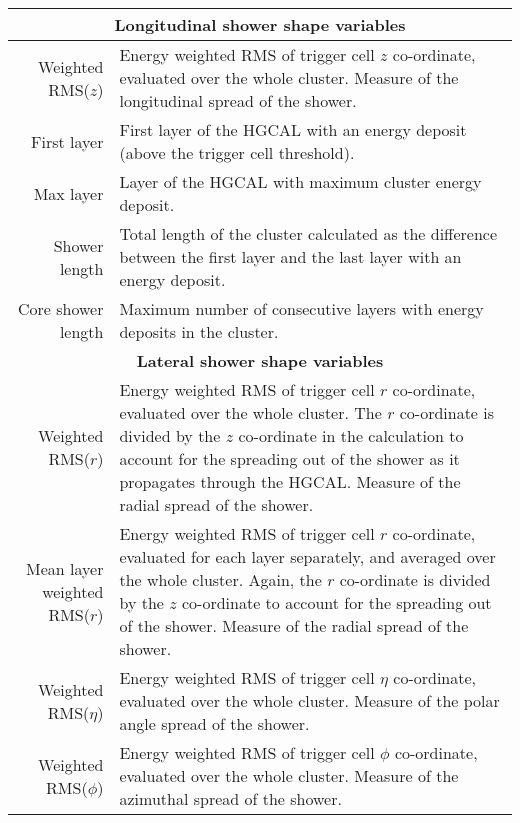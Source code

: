 \begin{tabular}{r|p{}}
    \multicolumn{2}{c}{\textbf{Longitudinal shower shape variables}} \\ \hline
    Weighted RMS($z$) & Energy weighted RMS of trigger cell $z$ co-ordinate, evaluated over the whole cluster. Measure of the longitudinal spread of the shower. \\
    First layer & First layer of the HGCAL with an energy deposit (above the trigger cell threshold). \\
    Max layer &  Layer of the HGCAL with maximum cluster energy deposit. \\
    Shower length & Total length of the cluster calculated as the difference between the first layer and the last layer with an energy deposit. \\
    Core shower length & Maximum number of consecutive layers with energy deposits in the cluster. \\
    \hline
    \multicolumn{2}{c}{\textbf{Lateral shower shape variables}} \\ \hline
    Weighted RMS($r$) & Energy weighted RMS of trigger cell $r$ co-ordinate, evaluated over the whole cluster. The $r$ co-ordinate is divided by the $z$ co-ordinate in the calculation to account for the spreading out of the shower as it propagates through the HGCAL. Measure of the radial spread of the shower. \\
    Mean layer weighted RMS($r$) & Energy weighted RMS of trigger cell $r$ co-ordinate, evaluated for each layer separately, and averaged over the whole cluster. Again, the $r$ co-ordinate is divided by the $z$ co-ordinate to account for the spreading out of the shower. Measure of the radial spread of the shower. \\
    Weighted RMS($\eta$) & Energy weighted RMS of trigger cell $\eta$ co-ordinate, evaluated over the whole cluster. Measure of the polar angle spread of the shower. \\
    Weighted RMS($\phi$) & Energy weighted RMS of trigger cell $\phi$ co-ordinate, evaluated over the whole cluster. Measure of the azimuthal spread of the shower.\\
\end{tabular}